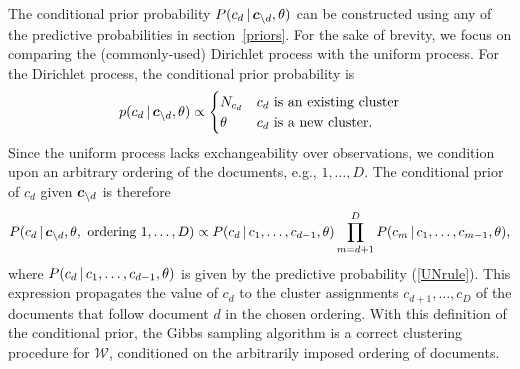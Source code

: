 \documentclass{article}
\begin{document}
The conditional prior probability $P(c_d \,|\, \boldsymbol{c}_{\setminus d},
\theta)$ can be constructed using any of the predictive probabilities
in section~\ref{priors}. For the sake of brevity, we focus on
comparing the (commonly-used) Dirichlet process with the uniform
process. For the Dirichlet process, the conditional prior probability
is 
\begin{equation}
p(c_d \,|\, \boldsymbol{c}_{\setminus d}, \theta) \propto \begin{cases} N_{c_d} &
  c_d \textrm{ is an existing cluster}\\ \theta & c_d \textrm{ is a
    new cluster.} \end{cases}
\end{equation}
Since the uniform process lacks exchangeability over observations, we
condition upon an arbitrary ordering of the documents, e.g., $1,
\dots, D$. The conditional prior of $c_d$ given $\boldsymbol{c}_{\setminus d}$ is
therefore
\begin{equation}
P(c_d \,|\, \boldsymbol{c}_{\setminus d}, \theta, \textrm{ ordering $1, \ldots, D$}) \propto P(c_d \,|\, c_1,\ldots,c_{d-1}, \theta) \prod_{m=d+1}^{D} P(c_m \,|\, c_1,\ldots,c_{m-1}, \theta),
\end{equation}
where $P(c_d \,|\, c_1,\ldots,c_{d-1}, \theta)$ is given by the
predictive probability (\ref{UNrule}).  This expression propagates the
value of $c_d$ to the cluster assignments $c_{d+1}, \ldots, c_D$ of the
documents that follow document $d$ in the chosen ordering. With this
definition of the conditional prior, the Gibbs sampling algorithm is a
correct clustering procedure for $\mathcal{W}$, conditioned on the
arbitrarily imposed ordering of documents.  
\end{document}

